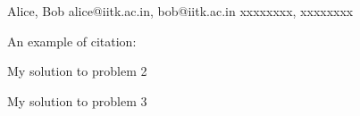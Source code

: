 \documentclass[a4paper,11pt]{article}
\begin{document}
{Alice, Bob}                            %
{alice@iitk.ac.in, bob@iitk.ac.in}      %
{xxxxxxxx, xxxxxxxx}                    %

\begin{iotsolution}

An example of citation: \cite{ref1}

\end{iotsolution}

\begin{iotsolution}

My solution to problem 2

\end{iotsolution}

\begin{iotsolution}

My solution to problem 3

\end{iotsolution}



\end{document}
